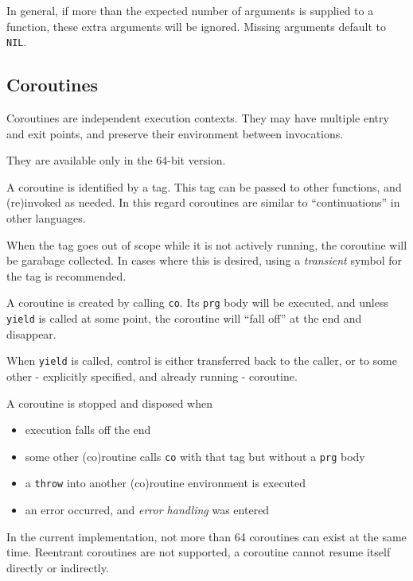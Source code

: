 In general, if more than the expected number of arguments is supplied to
a function, these extra arguments will be ignored. Missing arguments
default to \texttt{NIL}.

 

 
\subsection{Coroutines}
\label{sec:refm-coroutines}


Coroutines are independent execution contexts. They may have multiple
entry and exit points, and preserve their environment between
invocations.

They are available only in the 64-bit version.

A coroutine is identified by a tag. This tag can be passed to other
functions, and (re)invoked as needed. In this regard coroutines are
similar to ``continuations'' in other languages.

When the tag goes out of scope while it is not actively running, the
coroutine will be garabage collected. In cases where this is desired,
using a \emph{transient} symbol for the tag is recommended.

A coroutine is created by calling \texttt{co}. Its \texttt{prg} body will be executed,
and unless \texttt{yield} is called at some point, the coroutine will ``fall
off'' at the end and disappear.

When \texttt{yield} is called, control is either transferred back to the
caller, or to some other - explicitly specified, and already running -
coroutine.

A coroutine is stopped and disposed when

\begin{itemize}
\item execution falls off the end
\item some other (co)routine calls \texttt{co} with that tag but without a \texttt{prg}
   body
\item a \texttt{throw} into another (co)routine environment is executed
\item an error occurred, and \emph{error handling} was entered
\end{itemize}

In the current implementation, not more than 64 coroutines can exist at
the same time. Reentrant coroutines are not supported, a coroutine
cannot resume itself directly or indirectly.

 

